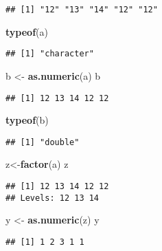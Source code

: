 \documentclass[]{article}
\newenvironment{Shaded}{\begin{snugshade}}{\end{snugshade}}
\newcommand{\KeywordTok}[1]{\textcolor[rgb]{0.13,0.29,0.53}{\textbf{#1}}}
\newcommand{\NormalTok}[1]{#1}
\newcommand{\StringTok}[1]{\textcolor[rgb]{0.31,0.60,0.02}{#1}}
\begin{document}
\begin{verbatim}
## [1] "12" "13" "14" "12" "12"
\end{verbatim}

\begin{Shaded}
\begin{Highlighting}[]
\KeywordTok{typeof}\NormalTok{(a)}
\end{Highlighting}
\end{Shaded}

\begin{verbatim}
## [1] "character"
\end{verbatim}

\begin{Shaded}
\begin{Highlighting}[]
\NormalTok{b <-}\StringTok{ }\KeywordTok{as.numeric}\NormalTok{(a)}
\NormalTok{b}
\end{Highlighting}
\end{Shaded}

\begin{verbatim}
## [1] 12 13 14 12 12
\end{verbatim}

\begin{Shaded}
\begin{Highlighting}[]
\KeywordTok{typeof}\NormalTok{(b)}
\end{Highlighting}
\end{Shaded}

\begin{verbatim}
## [1] "double"
\end{verbatim}

\begin{Shaded}
\begin{Highlighting}[]
\NormalTok{z<-}\KeywordTok{factor}\NormalTok{(a)}
\NormalTok{z}
\end{Highlighting}
\end{Shaded}

\begin{verbatim}
## [1] 12 13 14 12 12
## Levels: 12 13 14
\end{verbatim}

\begin{Shaded}
\begin{Highlighting}[]
\NormalTok{y <-}\StringTok{ }\KeywordTok{as.numeric}\NormalTok{(z)}
\NormalTok{y}
\end{Highlighting}
\end{Shaded}

\begin{verbatim}
## [1] 1 2 3 1 1
\end{verbatim}
\end{document}
